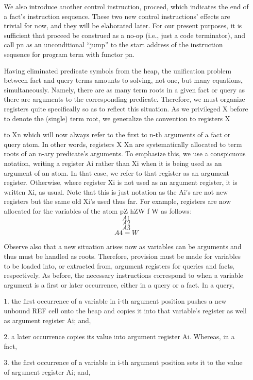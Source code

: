 We also introduce another control instruction, proceed, which indicates the end
of a fact’s instruction sequence. These two new control instructions’ effects are
trivial for now, and they will be elaborated later. For our present purposes, it is
sufficient that proceed be construed as a no-op (i.e., just a code terminator),
and call pn as an unconditional “jump” to the start address of the instruction
sequence for program term with functor pn.

Having eliminated predicate symbols from the heap, the unification problem between
fact and query terms amounts to solving, not one, but many equations,
simultaneously. Namely, there are as many term roots in a given fact or query as
there are arguments to the corresponding predicate. Therefore, we must organize
registers quite specifically so as to reflect this situation. As we privileged X
 before
to denote the (single) term root, we generalize the convention to registers X

to Xn which will now always refer to the first to n-th arguments of a fact or
query atom. In other words, registers X
Xn are systematically allocated to term roots of an n-ary predicate’s arguments.
To emphasize this, we use a conspicuous notation, writing a register Ai rather
than Xi when it is being used as an argument of an atom. In that case, we refer
to that register as an argument register. Otherwise, where register Xi is not
used as an argument register, it is written Xi, as usual. Note that this is just
notation as the Ai’s are not new registers but the same old Xi’s used thus far.
For example, registers are now allocated for the variables of the atom pZ hZW f
W as follows:
\[A1\]
\[A2\]
\[A3\]
\[A4=W\]

Observe also that a new situation arises now as variables can be arguments and
thus must be handled as roots. Therefore, provision must be made for variables
to be loaded into, or extracted from, argument registers for queries and facts,
respectively. As before, the necessary instructions correspond to when a variable
argument is a first or later occurrence, either in a query or a fact. In a query,

1. the first occurrence of a variable in i-th argument position pushes a new
unbound REF cell onto the heap and copies it into that variable’s register as
well as argument register Ai; and,

2. a later occurrence copies its value into argument register Ai. Whereas, in a
fact,

3. the first occurrence of a variable in i-th argument position sets it to the value
of argument register Ai; and,

